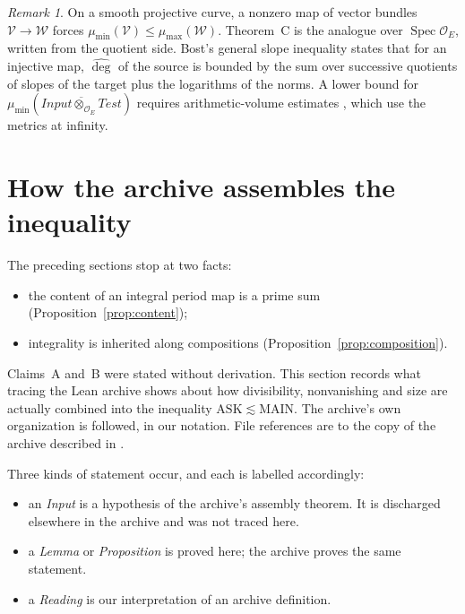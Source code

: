 \documentclass[11pt]{amsart}
\theoremstyle{definition}
\theoremstyle{remark}
\newtheorem{remark}[theorem]{Remark}
\newcommand{\OEring}{\mathcal{O}_E}
\newcommand{\Input}{\mathit{Input}}
\newcommand{\Test}{\mathit{Test}}
\DeclareMathOperator{\Spec}{Spec}
\newcommand{\adeg}{\widehat{\deg}}
\newcommand{\ASK}{\mathrm{ASK}}
\newcommand{\MAIN}{\mathrm{MAIN}}
\begin{document}
\begin{remark}
On a smooth projective curve, a nonzero map of vector bundles $\mathcal V\to\mathcal W$ forces $\mu_{\min}(\mathcal V)\le\mu_{\max}(\mathcal W)$. Theorem~C is the analogue over $\Spec\OEring$, written from the quotient side. Bost's general slope inequality \cite{Bost-Bourbaki} states that for an injective map, $\adeg$ of the source is bounded by the sum over successive quotients of slopes of the target plus the logarithms of the norms. A lower bound for $\mu_{\min}(\overline{\Input\otimes_{\OEring}\Test})$ requires arithmetic-volume estimates \cite{Gillet-Soule}, which use the metrics at infinity.
\end{remark}

\section{How the archive assembles the inequality}\label{sec:assembly}

The preceding sections stop at two facts:
\begin{itemize}
\item the content of an integral period map is a prime sum (Proposition~\ref{prop:content});
\item integrality is inherited along compositions (Proposition~\ref{prop:composition}).
\end{itemize}
Claims~A and~B were stated without derivation. This section records what tracing the Lean archive shows about how divisibility, nonvanishing and size are actually combined into the inequality $\ASK\lesssim\MAIN$. The archive's own organization is followed, in our notation. File references are to the copy of the archive described in \cite{golf}.

Three kinds of statement occur, and each is labelled accordingly:
\begin{itemize}
\item an \emph{Input} is a hypothesis of the archive's assembly theorem. It is discharged elsewhere in the archive and was not traced here.
\item a \emph{Lemma} or \emph{Proposition} is proved here; the archive proves the same statement.
\item a \emph{Reading} is our interpretation of an archive definition.
\end{itemize}
\end{document}
